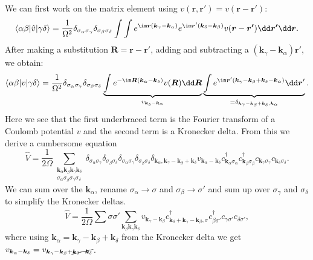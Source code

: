 \documentclass[../main.tex]{subfile}
\begin{document}
We can first work on the matrix element using $v(\bm{r}, \bm{r'})= v(\bm{r} - \bm{r'})$:
\[
    \langle \alpha \beta |\hat{v}|\gamma\delta\rangle = \frac{1}{\Omega^2} \delta_{\sigma_{\alpha}\sigma_{\gamma}}\delta_{\sigma_{\beta}\sigma_{\delta}} \int \int  e^{\im \bm{r}(\bm{k}_{\gamma}-\bm{k}_{\alpha})}  e^{\im \bm{r}'(\bm{k}_{\delta}-\bm{k}_{\beta})} v(\bm{r} - \bm{r'}) \dd \bm{r'} \dd \bm{r}.
\]
After making a substitution $\bm{R} = \bm{r} - \bm{r}'$, adding and subtracting a $(\bm{k}_{\gamma}-\bm{k}_{\alpha})\bm{r}'$, we obtain:
\[
    \langle \alpha \beta |v|\gamma\delta\rangle = \frac{1}{\Omega^2} \delta_{\sigma_{\alpha}\sigma_{\gamma}}\delta_{\sigma_{\beta}\sigma_{\delta}}
     \underbrace{\int e^{-\im\bm{R}(\bm{k}_{\alpha}- \bm{k}_{\delta})} v(\bm{R}) \dd \bm{R}}_{v_{\bm{k}_{\delta}- \bm{k}_{\alpha}}}
    \underbrace{\int e^{\im\bm{r}'\left(\bm{k}_{\gamma}-\bm{k}_{\beta} + \bm{k}_{\delta} -\bm{k}_{\alpha}\right)}\dd \bm{r}'}_{= \delta_{\bm{k}_{\gamma}-\bm{k}_{\beta} + \bm{k}_{\delta} , \bm{k}_{\alpha}}}.
\]
Here we see that the first underbraced term is the Fourier transform of a Coulomb potential $v$ and the second term is a Kronecker delta.
From this we derive a cumbersome equation
\[
    \hat{V} = \frac{1}{2\Omega} \sum_{\substack{\bm{k}_{\alpha}\bm{k}_{\beta}\bm{k}_{\gamma}\bm{k}_{\delta} \\
         \sigma_{\alpha}\sigma_{\beta}\sigma_{\gamma}\sigma_{\delta}}}
    \delta_{\sigma_{\alpha}\sigma_{\gamma}}\delta_{\sigma_{\beta}\sigma_{\delta}}
    \delta_{\sigma_{\alpha}\sigma_{\gamma}}\delta_{\sigma_{\beta}\sigma_{\delta}}
    \delta_{ \bm{k}_{\alpha}, \bm{k}_{\gamma}-\bm{k}_{\beta} + \bm{k}_{\delta}}
    v_{\bm{k}_{\alpha}- \bm{k}_{\delta}} c_{\bm{k}_\alpha\sigma_{\alpha}}^{\dagger}c_{\bm{k}_\beta\sigma_{\beta}}^{\dagger}c_{\bm{k}_\gamma\sigma_{\gamma}}c_{\bm{k}_\delta\sigma_{\delta}}.
\]
We can sum over the $\bm{k}_{\alpha}$, rename $\sigma_{\alpha} \rightarrow\sigma$ and $\sigma_{\beta} \rightarrow\sigma'$
 and sum up over $\sigma_{\gamma}$ and $\sigma_{\delta}$ to simplify the Kronecker deltas.
\[
    \hat{V} = \frac{1}{2\Omega} \sum{\sigma\sigma'} \sum_{\bm{k}_{\beta}\bm{k}_{\gamma}\bm{k}_{\delta}} v_{\bm{k}_{\gamma}- \bm{k}_{\beta}} c^{\dagger}_{\bm{k}_{\delta}+ \bm{k}_{\gamma}-\bm{k}_{\beta},\sigma}
        c^{\dagger}_{\beta\sigma'} c_{\gamma\sigma'} c_{\delta\sigma'} ,
\] 
where using $\bm{k}_{\alpha} = \bm{k}_{\gamma}-\bm{k}_{\beta} + \bm{k}_{\delta}$ from the Kronecker delta we get $v_{\bm{k}_{\alpha}- \bm{k}_{\delta}} = v_{\bm{k}_{\gamma}-\bm{k}_{\beta} + \cancel{\bm{k}_{\delta}-\bm{k}_{\delta}}}$.
\end{document}
